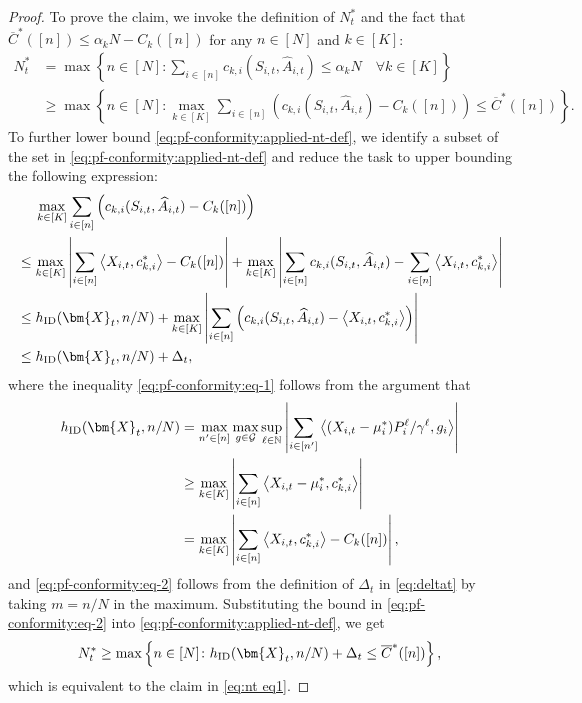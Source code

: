 \documentclass{article}
\theoremstyle{plain}
\theoremstyle{remark}
\newcommand{\abs}[1]{\left\lvert#1\right\rvert}
\newcommand{\supell}{\sup_{\ell\in\mathbb{N}}}
\newcommand{\maxk}{\max_{k\in[K]}}
\newcommand{\ID}{\textnormal{ID}}
\newcommand{\rembud}{\overline{C}^*} %
\def\mX{{\bm{X}}}
\newcommand{\innerproduct}[2]{\left\langle #1, #2 \right\rangle}
\newcommand{\bracket}[1]{\left(#1\right)}
\newcommand{\sets}[1]{\left\{ #1 \right\}}
\begin{document}
\begin{proof}
To prove the claim, we invoke the definition of $N_t^*$ and the fact that $\rembud([n])\leq \alpha_k N - C_k([n])$ for any $n\in [N]$ and $k\in[K]$: 
    \begin{align}
        \nonumber
        N_t^* 
        &= \max\sets{n\in[N]\colon  \sum_{i\in[n]} c_{k,i}(S_{i,t},\widehat{A}_{i,t})  \leq \alpha_k N \quad \forall k\in[K]}     \\
        \label{eq:pf-conformity:applied-nt-def}
        &\geq \max\sets{n\in[N]\colon \maxk  \sum_{i\in[n]} \left(c_{k,i}(S_{i,t},\widehat{A}_{i,t}) - C_k([n]) \right) \leq \rembud([n])}.
    \end{align}
    To further lower bound \eqref{eq:pf-conformity:applied-nt-def}, we identify a subset of the set in \eqref{eq:pf-conformity:applied-nt-def} and reduce the task to upper bounding the following expression: 
    \begin{align}
        \nonumber
        &\mspace{23mu} \maxk  \sum_{i\in[n]} \left( c_{k,i}(S_{i,t},\widehat{A}_{i,t}) - C_k([n]) \right) \\
        \nonumber
        &\leq\maxk \abs{\sum_{i\in[n]}\innerproduct{X_{i,t}}{c_{k,i}^*}- C_k([n])}+ \maxk \abs{\sum_{i\in[n]}c_{k,i}(S_{i,t},\widehat{A}_{i,t})- \sum_{i\in[n]}\innerproduct{X_{i,t}}{c_{k,i}^*}}\\
        \label{eq:pf-conformity:eq-1}
        &\leq h_{\ID}(\mX_t,n/N) + \maxk \abs{\sum_{i\in[n]}\bracket{c_{k,i}(S_{i,t},\widehat{A}_{i,t})- \innerproduct{X_{i,t}}{c_{k,i}^*}}} \\
        \label{eq:pf-conformity:eq-2}
        &\leq h_{\ID}(\mX_t,n/N) + \Delta_t, 
    \end{align}
    where the inequality \eqref{eq:pf-conformity:eq-1} follows from the argument that
    \begin{align*}
        h_{\ID}(\mX_t,n/N)&=\max_{n'\in[n]}\max_{g\in \mathcal{G}} \supell \abs{\sum_{i\in[n']}\innerproduct{(X_{i,t}-\mu_i^*)P_i^{\ell}/\gamma^{\ell}}{g_i}}\\
        &\geq \maxk\abs{\sum_{i\in[n]}\innerproduct{X_{i,t}-\mu_i^*}{c_{k,i}^*}}\\
        &=\maxk\abs{\sum_{i\in[n]}\innerproduct{X_{i,t}}{c_{k,i}^*}- C_k([n])},
    \end{align*} 
    and \eqref{eq:pf-conformity:eq-2} follows from the definition of $\Delta_t$ in \eqref{eq:deltat} by taking $m=n/N$ in the maximum. 
    Substituting the bound in \eqref{eq:pf-conformity:eq-2} into \eqref{eq:pf-conformity:applied-nt-def}, we get
    \[
        N^*_t \geq \max\sets{n\in[N]\colon h_{\ID}(\mX_t,n/N) + \Delta_t \leq \rembud([n])},
    \]
    which is equivalent to the claim in \eqref{eq:nt eq1}. 



\end{proof}
\end{document}
